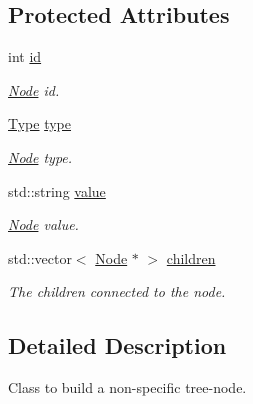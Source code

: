 \subsection*{Protected Attributes}
\begin{DoxyCompactItemize}
\item 
\hypertarget{classNode_a59a543130a10c95f1e8642cf8c5645e8}{}int \hyperlink{classNode_a59a543130a10c95f1e8642cf8c5645e8}{id}\label{classNode_a59a543130a10c95f1e8642cf8c5645e8}

\begin{DoxyCompactList}\small\item\em \hyperlink{classNode}{Node} id. \end{DoxyCompactList}\item 
\hypertarget{classNode_adcaf01927a597ad0e6025b173fe5e552}{}\hyperlink{classNode_a8dad370be1595f49e0a7c2406a91e867}{Type} \hyperlink{classNode_adcaf01927a597ad0e6025b173fe5e552}{type}\label{classNode_adcaf01927a597ad0e6025b173fe5e552}

\begin{DoxyCompactList}\small\item\em \hyperlink{classNode}{Node} type. \end{DoxyCompactList}\item 
\hypertarget{classNode_a51de8a12e67206f893b0bd6c2afeb11c}{}std\+::string \hyperlink{classNode_a51de8a12e67206f893b0bd6c2afeb11c}{value}\label{classNode_a51de8a12e67206f893b0bd6c2afeb11c}

\begin{DoxyCompactList}\small\item\em \hyperlink{classNode}{Node} value. \end{DoxyCompactList}\item 
\hypertarget{classNode_a49baf1d613dc14f1e1e4aad883dde6fe}{}std\+::vector$<$ \hyperlink{classNode}{Node} $\ast$ $>$ \hyperlink{classNode_a49baf1d613dc14f1e1e4aad883dde6fe}{children}\label{classNode_a49baf1d613dc14f1e1e4aad883dde6fe}

\begin{DoxyCompactList}\small\item\em The children connected to the node. \end{DoxyCompactList}\end{DoxyCompactItemize}


\subsection{Detailed Description}
Class to build a non-\/specific tree-\/node. 

